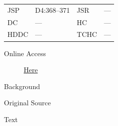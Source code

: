 				\begin{tabular}{p{0.5in}p{1in}p{0.5in}p{1in}}
				JSP	 	& D4:368--371		& JSR 		& --- \\
				DC	 	& --- 				& HC 		& --- \\
				HDDC 	& ---				& TCHC 		& --- \\
				\end{tabular}
			
			\begin{description}
				\item[Online Access] \href{https://www.josephsmithpapers.org/paper-summary/letter-to-sally-waterman-phelps-20-july-1835/1}{Here}
			\end{description}
			
			\begin{description}
				\item[Background]
			\end{description}
			
			
			\begin{description}
				\item[Original Source]
			\end{description}
			
			
			\begin{description}
				\item[Text]
			\end{description}
			
